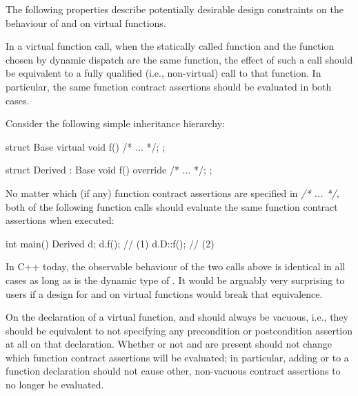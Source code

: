 The following properties describe potentially desirable design constraints on the behaviour of  and  on virtual functions.



In a virtual function call, when the statically called function and the function chosen by dynamic dispatch are the same function, the effect of such a call should be equivalent to a fully qualified (i.e., non-virtual) call to that function. In particular, the same function contract assertions should be evaluated in both cases.

Consider the following simple inheritance hierarchy:

\begin{codeblock}
struct Base {
  virtual void f() /* ... */;
};

struct Derived : Base {
  void f() override /* ... */;
};
\end{codeblock}
No matter which (if any) function contract assertions are specified in \textit{/* ... */}, both of the following function calls should evaluate the same function contract assertions when executed:

\begin{codeblock}
int main() {
  Derived d;
  d.f();     // (1)
  d.D::f();  // (2)
}
\end{codeblock}
In C++ today, the observable behaviour of the two calls above is identical in all cases as long as  is the dynamic type of . It would be arguably very surprising to users if a design for  and  on virtual functions would break that equivalence.



On the declaration of a virtual function,  and  should always be vacuous, i.e., they should be equivalent to not specifying any precondition or postcondition assertion at all on that declaration. Whether or not  and  are present should not change which function contract assertions will be evaluated; in particular, adding  or  to a function declaration should not cause other, non-vacuous contract assertions to no longer be evaluated.

